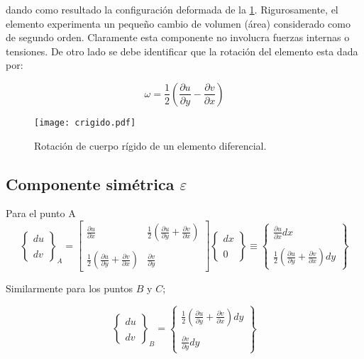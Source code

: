 \documentclass[../notas medios.tex]{subfiles}
\begin{document}
dando como resultado la configuración deformada de la \cref{crigido}. Rigurosamente, el elemento experimenta un pequeño cambio de volumen (área) considerado como de segundo orden. Claramente esta componente no involucra fuerzas internas o tensiones. De otro lado se debe identificar que la rotación del elemento esta dada por:

\[\omega = \frac{1}{2}\left( {\frac{{\partial u}}{{\partial y}} - \frac{{\partial v}}{{\partial x}}}\right)\]

\begin{figure}[H]
\centering
	\texttt{[image: crigido.pdf]}
	\caption{Rotación de cuerpo rígido de un elemento diferencial.}
	\label{crigido}
\end{figure}

\subsection{Componente simétrica $\varepsilon$}
Para el punto A
\[{\left\{ {\begin{array}{*{20}{c}}
{du}\\\\
{dv}
\end{array}} \right\}_A} = \left[ {\begin{array}{*{20}{c}}
{\frac{{\partial u}}{{\partial x}}}&{\frac{1}{2}\left( {\frac{{\partial u}}{{\partial y}} + \frac{{\partial v}}{{\partial x}}} \right)}\\\\
{\frac{1}{2}\left( {\frac{{\partial u}}{{\partial y}} + \frac{{\partial v}}{{\partial x}}} \right)}&{\frac{{\partial v}}{{\partial y}}}
\end{array}} \right]\left\{ {\begin{array}{*{20}{c}}
{dx}\\\\
0
\end{array}} \right\} \equiv \left\{ {\begin{array}{*{20}{c}}
{\frac{{\partial u}}{{\partial x}}dx}\\\\
{\frac{1}{2}\left( {\frac{{\partial u}}{{\partial y}} + \frac{{\partial v}}{{\partial x}}} \right)dy}
\end{array}} \right\}\]

Similarmente para los puntos $B$ y $C$;

\[{\left\{ {\begin{array}{*{20}{c}}
{du}\\\\
{dv}
\end{array}} \right\}_B} = \left\{ {\begin{array}{*{20}{c}}
{\frac{1}{2}\left( {\frac{{\partial u}}{{\partial y}} + \frac{{\partial v}}{{\partial x}}} \right)dy}\\\\
{\frac{{\partial v}}{{\partial y}}dy}
\end{array}} \right\}\]
\end{document}
